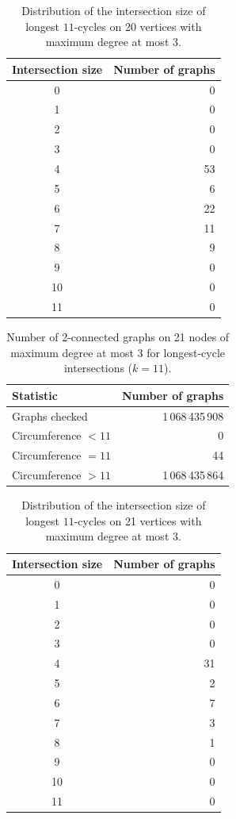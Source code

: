 \begin{table}[ht]
\centering
\caption{Distribution of the intersection size of longest $11$-cycles on 20 vertices with maximum degree at most 3.}
\label{tab:intersection-d20d3}
\begin{tabular}{cr}
\toprule
Intersection size & Number of graphs \\
\midrule
0 & 0 \\
1 & 0 \\
2 & 0 \\
3 & 0 \\
4 & 53 \\
5 & 6 \\
6 & 22 \\
7 & 11 \\
8 & 9 \\
9 & 0 \\
10 & 0 \\
11 & 0 \\
\bottomrule
\end{tabular}
\end{table}

\begin{table}[ht]
\centering
\caption{Number of 2-connected graphs on 21 nodes of maximum degree at most 3 for longest-cycle intersections ($k=11$).}
\label{tab:summary-geng-2con-n21}
\begin{tabular}{lr}
\toprule
Statistic & Number of graphs \\
\midrule
Graphs checked & 1\,068\,435\,908 \\
Circumference $<11$ & 0 \\
Circumference $=11$ & 44 \\
Circumference $>11$ & 1\,068\,435\,864 \\
\bottomrule
\end{tabular}
\end{table}


\begin{table}[ht]
\centering
\caption{Distribution of the intersection size of longest $11$-cycles on 21 vertices with maximum degree at most 3.}
\label{tab:intersection-d21d3}
\begin{tabular}{cr}
\toprule
Intersection size & Number of graphs \\
\midrule
0 & 0 \\
1 & 0 \\
2 & 0 \\
3 & 0 \\
4 & 31 \\
5 & 2 \\
6 & 7 \\
7 & 3 \\
8 & 1 \\
9 & 0 \\
10 & 0 \\
11 & 0 \\
\bottomrule
\end{tabular}
\end{table}


